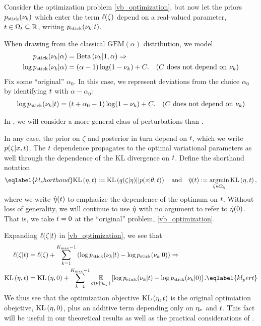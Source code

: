 Consider the optimization problem \eqref{vb_optimization}, but now let the
priors $p_{\mathrm{stick}}(\nu_{k})$ which enter the term $\ell(\zeta)$ depend on a
real-valued parameter, $t \in \Omega_{t} \subseteq \mathbb{R}$, writing
$p_{\mathrm{stick}}(\nu_{k} \vert t)$.

\begin{ex}
%
When drawing from the classical $\mathrm{GEM}(\alpha)$ distribution, we
model
%
\begin{align*}
%
\pstick(\nuk \vert \alpha) ={}&
    \betadist{\nuk \vert 1, \alpha} \Rightarrow\\
\log \pstick(\nuk \vert \alpha) ={}&
    (\alpha - 1) \log(1 - \nuk) + \const. &
    \constdesc{\nuk}
%
\end{align*}
%
Fix some ``original'' $\alpha_0$.  In this case, we represent deviations from the
choice $\alpha_0$ by identifying $t$ with $\alpha - \alpha_0$:
%
\begin{align*}
%
\log \pstick(\nuk \vert \t) ={}&
    (\t + \alpha_0 - 1) \log(1 - \nuk) + \const. &
    \constdesc{\nuk}
%
\end{align*}
%
\end{ex}

In , we will consider a more general class of
perturbations than .

In any case, the prior on $\zeta$ and posterior in turn depend on $t$, which we
write $p(\zeta \vert x, t)$. The $t$ dependence propagates to the optimal
variational parameters as well through the dependence of the KL divergence on
$t$.  Define the shorthand notation
%
\begin{align}\eqlabel{kl_shorthand}
%
\KL{\eta, \t} := \KL{\q(\zeta \vert \eta) || p(\x \vert \theta, \t)}
\mathand
\etaopt(\t) := \argmin_{\zeta \in \etadom} \KL{\eta, \t},
%
\end{align}
%
where we write $\hat\eta(t)$ to emphasize the dependence of the optimum on $t$.
Without loss of generality, we will continue to use $\hat\eta$ with no argument
to refer to $\hat\eta(0)$.  That is, we take $t = 0$ at the ``original''
problem, \eqref{vb_optimization}.

Expanding $\ell(\zeta \vert t)$ in \eqref{vb_optimization}, we see that
%
\begin{align}
%
\logp(\zeta \vert \t) ={}& \logp(\zeta) +
    \sumkm \left( \log \pstick(\nuk\vert\t) -
                  \log \pstick(\nuk \vert 0) \right) \Rightarrow \nonumber\\
\KL{\eta, \t} ={}&
    \KL{\eta, 0} +
    \sumkm \expect{\q(\nu\vert\etanuk)}{
        \log \pstick(\nuk\vert\t) - \log \pstick(\nuk \vert 0)
    }. \eqlabel{kl_pert}
%
\end{align}
%
We thus see that the optimization objective $\mathrm{KL}\left(\eta, t\right)$ is the original
optimiation obejctive, $\mathrm{KL}\left(\eta, 0\right)$, plus an additive term depending only on
$\eta_{\nu}$ and $t$.  This fact will be useful in our theoretical results as well
as the practical considerations of .

